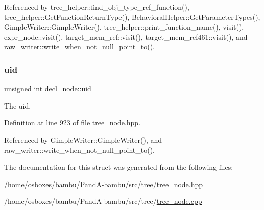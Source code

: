 Referenced by tree\+\_\+helper\+::find\+\_\+obj\+\_\+type\+\_\+ref\+\_\+function(), tree\+\_\+helper\+::\+Get\+Function\+Return\+Type(), Behavioral\+Helper\+::\+Get\+Parameter\+Types(), Gimple\+Writer\+::\+Gimple\+Writer(), tree\+\_\+helper\+::print\+\_\+function\+\_\+name(), visit(), expr\+\_\+node\+::visit(), target\+\_\+mem\+\_\+ref\+::visit(), target\+\_\+mem\+\_\+ref461\+::visit(), and raw\+\_\+writer\+::write\+\_\+when\+\_\+not\+\_\+null\+\_\+point\+\_\+to().

\mbox{\label{structdecl__node_aaefaebdb0a81bf16733e9f88089bc318}} 
\subsubsection{\texorpdfstring{uid}{uid}}
{\footnotesize\ttfamily unsigned int decl\+\_\+node\+::uid}



The uid. 



Definition at line 923 of file tree\+\_\+node.\+hpp.



Referenced by Gimple\+Writer\+::\+Gimple\+Writer(), and raw\+\_\+writer\+::write\+\_\+when\+\_\+not\+\_\+null\+\_\+point\+\_\+to().



The documentation for this struct was generated from the following files\+:\begin{DoxyCompactItemize}
\item 
/home/osboxes/bambu/\+Pand\+A-\/bambu/src/tree/\hyperlink{tree__node_8hpp}{tree\+\_\+node.\+hpp}\item 
/home/osboxes/bambu/\+Pand\+A-\/bambu/src/tree/\hyperlink{tree__node_8cpp}{tree\+\_\+node.\+cpp}\end{DoxyCompactItemize}
